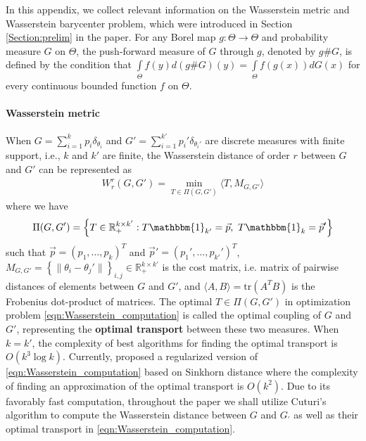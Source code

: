 In this appendix, we collect relevant information on the Wasserstein metric and 
Wasserstein barycenter problem, which were introduced in Section \ref{Section:prelim} in the paper. 
For any Borel map $g: \Theta \to \Theta$ and probability measure $G$ on $\Theta$, the 
push-forward measure of $G$ through $g$, denoted by $g\#G$, is defined by the condition
that
$\int \limits_{\Theta}{f(y)}d(g\#G)(y)=\int \limits_{\Theta}{f(g(x))}d G(x)$ for every 
continuous bounded function $f$ on $\Theta$.
\paragraph{Wasserstein metric} \label{Section:Append_Wasserstein_metric}
When $G = \sum \limits_{i=1}^{k}{p_{i}\delta_{\theta_{i}}}$ and $G'=\sum  \limits_{i=1}^{k'}{p_{i}'\delta_{\theta_{i}'}}$ 
are discrete measures with finite support, i.e., $k$ and $k'$ are finite, 
the Wasserstein distance of order $r$ between $G$ and $G'$ can be represented as
\begin{eqnarray}
W_{r}^{r}(G,G') = \min \limits_{T \in \Pi(G,G')} \langle T,M_{G,G'} \rangle \label{eqn:Wasserstein_computation}
\end{eqnarray}
where we have
\begin{eqnarray}
\Pi(G,G') = \left\{T \in \mathbb{R}_{+}^{k \times k'}: T\mathbbm{1}_{k'}=\vec{p}, \ T\mathbbm{1}_{k}=\vec{p}'\right\} \nonumber
\end{eqnarray}
such that $\vec{p}=(p_{1},\ldots,p_{k})^{T}$ and $\vec{p}'=(p_{1}',\ldots,p_{k'}')^{T}$, 
$M_{G,G'} = \left\{\|\theta_{i}-\theta_{j}'\|\right\}_{i,j} \in \mathbb{R}_{+}^{k \times k'}
$ is the cost matrix, i.e. matrix of pairwise distances of elements between $G$ and $G'$, and 
$\langle A, B \rangle =  \text{tr}(A^{T}B)$ is the Frobenius dot-product of matrices. The 
optimal $T \in \Pi(G,G')$ in optimization problem \eqref{eqn:Wasserstein_computation} is called 
the optimal coupling of $G$ and $G'$, representing the \textbf{optimal transport} between these two measures. 
When $k=k'$, 
the complexity of best algorithms for finding the optimal transport is $O(k^{3}\log k)$. 
Currently, \cite{Cuturi-2013} proposed a regularized version of 
\eqref{eqn:Wasserstein_computation} based on Sinkhorn distance where the complexity of 
finding an approximation of the optimal transport is $O(k^{2})$. Due to its favorably
fast computation, throughout the paper we shall utilize Cuturi's algorithm to compute the Wasserstein 
distance between $G$ and $G_{'}$ as well as their optimal transport in 
\eqref{eqn:Wasserstein_computation}.
